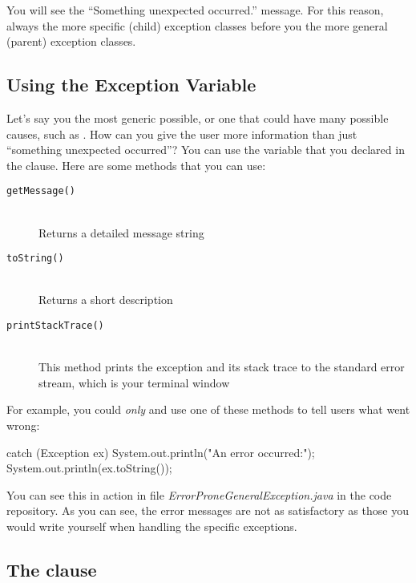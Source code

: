 You will see the ``Something unexpected occurred.'' message.  For this reason, always  the more specific (child) exception classes before you  the more general (parent) exception classes.

\subsection{Using the Exception Variable}

Let's say you  the most generic  possible, or one that could have many possible causes, such as . How can you give the user more information than just ``something unexpected occurred''? You can use the variable that you declared in the  clause. Here are some methods that you can use\footnotemark:


\begin{description}
  \item[\texttt{getMessage()}] \hfill \\ Returns a detailed message string
  \item[\texttt{toString()}] \hfill \\ Returns a short description
  \item[\texttt{printStackTrace()}] \hfill \\ This  method prints the exception and its stack trace to the standard error stream, which is your terminal window
\end{description}

For example, you could  {\em only}  and use one of these methods to tell users what went wrong:

\begin{code}
catch (Exception ex) {
    System.out.println("An error occurred:");
    System.out.println(ex.toString());
}
\end{code}

You can see this in action in file {\it ErrorProneGeneralException.java} in the code repository. As you can see, the error messages are not as satisfactory as those you would write yourself when handling the specific exceptions.


\subsection{The  clause}

